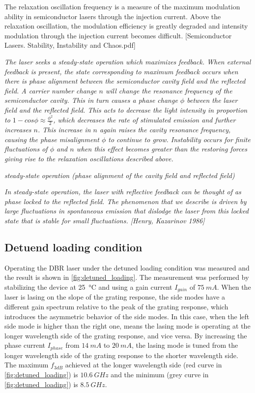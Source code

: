 The relaxation oscillation frequency is a measure of the maximum modulation ability in semiconductor lasers through the injection current. Above the relaxation oscillation, the modulation efficiency is greatly degraded and intensity modulation through the injection current becomes difficult. [Semiconductor Lasers. Stability, Instability and Chaos.pdf]

\textit{The laser seeks a steady-state operation which maximizes feedback. When external feedback is present, the state corresponding to maximum feedback occurs when there is phase alignment  between the semiconductor cavity field and the reflected field. A carrier number change $n$ will change the resonance frequency of the semiconductor cavity. This in turn causes a phase change $\phi$ between the laser field and the reflected field. This acts to decrease the light intensity in proportion to $1-cos{\phi}\approx\frac{\phi^2}{2}$, which decreases the rate of stimulated emission and further increases $n$. This increase in $n$ again raises the cavity resonance frequency, causing the phase misalignment $\phi$ to continue to grow. Instability occurs for finite fluctuations of $\phi$ and $n$ when this effect becomes greater than the restoring forces giving rise to the relaxation oscillations described above.}

\textit{steady-state operation (phase alignment of the cavity field and reflected field)}

\textit{In steady-state operation, the laser with reflective feedback can be thought of as phase locked to the reflected field. The phenomenon that we describe is driven by large fluctuations in spontaneous emission that dislodge the laser from this locked state that is stable for small fluctuations. [Henry, Kazarinov 1986]}

\subsection{Detuend loading condition}\label{subsec:detuned_laoding_measurement}
Operating the DBR laser under the detuned loading condition was measured and the result is shown in \autoref{fig:detuned_loading}. The measurement was performed by stabilizing the device at \SI{25}{\celsius} and using a gain current $I_{gain}$ of $75 \ mA$. When the laser is lasing on the slope of the grating response, the side modes have a different gain spectrum relative to the peak of the grating response, which introduces the asymmetric behavior of the side modes. In this case, when the left side mode is higher than the right one, means the lasing mode is operating at the longer wavelength side of the grating response, and vice versa. By increasing the phase current $I_{phase}$ from $14 \ mA$ to $20 \ mA$, the lasing mode is tuned from the longer wavelength side of the grating response to the shorter wavelength side. The maximum $f_{3dB}$ achieved at the longer wavelength side (red curve in \autoref{fig:detuned_loading}) is $10.6 \ GHz$ and the minimum (grey curve in \autoref{fig:detuned_loading}) is $8.5 \ GHz$. 

